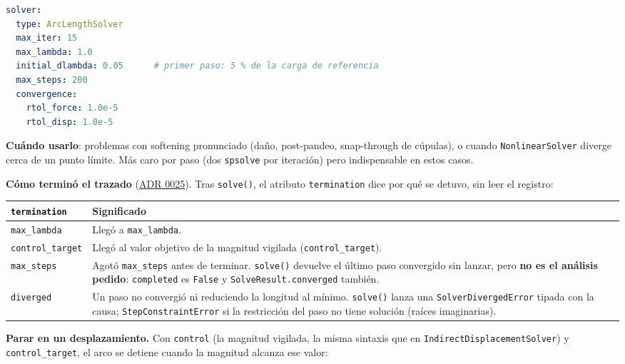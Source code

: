 \documentclass[11pt,oneside]{report}
\begin{document}
\begin{lstlisting}[language=yaml]
solver:
  type: ArcLengthSolver
  max_iter: 15
  max_lambda: 1.0
  initial_dlambda: 0.05      # primer paso: 5 % de la carga de referencia
  max_steps: 200
  convergence:
    rtol_force: 1.0e-5
    rtol_disp: 1.0e-5

\end{lstlisting}

\textbf{Cuándo usarlo}: problemas con softening pronunciado (daño, post-pandeo, snap-through de cúpulas), o cuando \texttt{NonlinearSolver} diverge cerca de un punto límite. Más caro por paso (dos \texttt{spsolve} por iteración) pero indispensable en estos casos.

\textbf{Cómo terminó el trazado} (\href{https://github.com/jretamav/solidum-fem/blob/main/docs/adr/0025-terminacion-de-los-solvers-incrementales-y-registro.md}{ADR 0025}). Tras \texttt{solve()}, el atributo \texttt{termination} dice por qué se detuvo, sin leer el registro:

\begin{center}
\begin{tabularx}{\textwidth}{YY}
\hline
\textbf{\texttt{termination}} & \textbf{Significado} \\
\hline
\texttt{\textquotedbl{}max\_lambda\textquotedbl{}} & Llegó a \texttt{max\_lambda}. \\
\texttt{\textquotedbl{}control\_target\textquotedbl{}} & Llegó al valor objetivo de la magnitud vigilada (\texttt{control\_target}). \\
\texttt{\textquotedbl{}max\_steps\textquotedbl{}} & Agotó \texttt{max\_steps} antes de terminar. \texttt{solve()} devuelve el último paso convergido sin lanzar, pero \textbf{no es el análisis pedido}: \texttt{completed} es \texttt{False} y \texttt{SolveResult.\allowbreak{}converged} también. \\
\texttt{\textquotedbl{}diverged\textquotedbl{}} & Un paso no convergió ni reduciendo la longitud al mínimo. \texttt{solve()} lanza una \texttt{SolverDivergedError} tipada con la causa; \texttt{StepConstraintError} si la restricción del paso no tiene solución (raíces imaginarias). \\
\hline
\end{tabularx}
\end{center}
\textbf{Parar en un desplazamiento.} Con \texttt{control} (la magnitud vigilada, la misma sintaxis que en \texttt{IndirectDisplacementSolver}) y \texttt{control\_target}, el arco se detiene cuando la magnitud alcanza ese valor:
\end{document}
